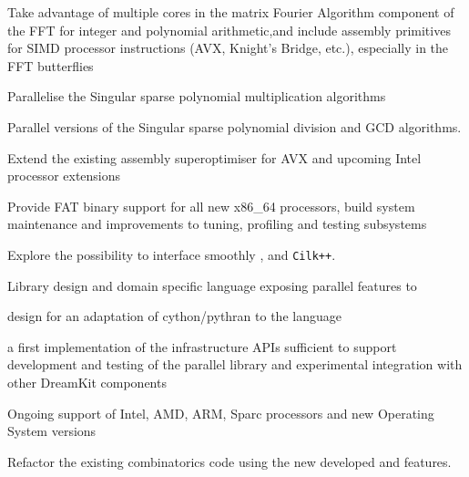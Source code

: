 \begin{workpackage}
\begin{wpdelivs}
  \begin{wpdeliv}[due=12,id=FFT,dissem=PU,nature=DEM]
    {Take advantage of multiple cores in the matrix Fourier Algorithm component of the FFT
      for integer and polynomial arithmetic,and include assembly primitives for SIMD
      processor instructions (AVX, Knight's Bridge, etc.), especially in the FFT
      butterflies}
\end{wpdeliv}
  \begin{wpdeliv}[due=12,id=singular-polymul,dissem=PU,nature=DEM]
      {Parallelise the Singular sparse polynomial multiplication algorithms}
\end{wpdeliv}
  \begin{wpdeliv}[due=12,id=singular-polyarith,dissem=PU,nature=DEM]
      {Parallel versions of the Singular sparse polynomial division and GCD algorithms.}
\end{wpdeliv}
  \begin{wpdeliv}[due=12,id=MPIRsuperoptimiser,dissem=PU,nature=DEM]
      {Extend the existing assembly superoptimiser for AVX and upcoming Intel processor extensions}
\end{wpdeliv}
  \begin{wpdeliv}[due=12,id=MPIRfat,dissem=PU,nature=DEM]
      {Provide FAT binary support for all new x86\_64 processors, build system maintenance and improvements to tuning, profiling and testing subsystems}
\end{wpdeliv}
  \begin{wpdeliv}[due=12,id=HPCcombi,dissem=PU,nature=DEM]
      {Explore the possibility to    interface smoothly \Pythran, \Cython and \texttt{Cilk++}.}
\end{wpdeliv}
  \begin{wpdeliv}[due=12,id=LinBox-DSL,dissem=PU,nature=R]
    {Library design and domain specific language exposing \Linbox parallel features to \Sage}
  \end{wpdeliv}
  \begin{wpdeliv}[due=18,id=GAP-cython-design,dissem=public,nature=report]
    {design for an adaptation of cython/pythran to the \GAP language}
  \end{wpdeliv}
  \begin{wpdeliv}[due=21,id=GAP-APIs-impl,dissem=public,nature=software]
      {a first implementation of the infrastructure APIs
  sufficient to support development and testing of the parallel
  library and experimental integration with other DreamKit components}
\end{wpdeliv}
  \begin{wpdeliv}[due=24,id=MPIRprocessors,dissem=PU,nature=DEM]
      {Ongoing support of Intel, AMD, ARM, Sparc processors and new Operating System versions}
\end{wpdeliv}
  \begin{wpdeliv}[due=24,id=HPCcombi,dissem=PU,nature=DEM]
      {Refactor the existing combinatorics \Sage    code using the new developed  \Pythran and \Cython features.}
\end{wpdeliv}


\end{wpdelivs}
\end{workpackage}
